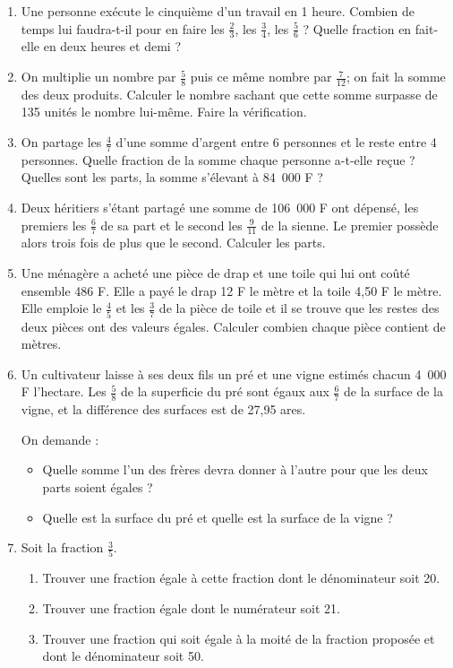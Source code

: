 \documentclass[12 pt]{extarticle}
\theoremstyle{plain}
\begin{document}
\begin{enumerate}
\item Une personne exécute le cinquième d'un travail en 1 heure. Combien de temps lui faudra-t-il pour en 
faire les $\frac23$, les $\frac34$, les $\frac56$ ?
Quelle fraction en fait-elle en deux heures et demi ? 
\item On multiplie un nombre par $\frac58$ puis ce même nombre par $\frac7{12}$; on fait la somme des deux produits. Calculer le nombre sachant que cette somme surpasse de 135 unités le nombre lui-même. Faire la vérification. 
\item On partage les $\frac47$ d'une somme d'argent entre 6 personnes et le reste entre 4 personnes. 
Quelle fraction de la somme chaque personne a-t-elle 
reçue ? Quelles sont les parts, la somme s'élevant à 84~000 F ? 
\item Deux héritiers s'étant partagé une somme de 106~000 F ont dépensé, les premiers les $\frac67$ de sa part et le second les $\frac9{11}$ de la sienne. Le premier possède alors trois fois de plus que le second. Calculer les parts. 
\item Une ménagère a acheté une pièce de drap et une toile qui lui ont coûté ensemble 486 F. Elle a payé le drap 12 F le mètre et la toile 4,50 F le mètre. Elle emploie le $\frac45$ et les $\frac37$ de la pièce de toile et il se trouve que les restes des deux pièces ont des valeurs égales. Calculer combien chaque pièce contient de mètres. 
\item Un cultivateur laisse à ses deux fils un pré et une vigne estimés chacun 4~000 F l'hectare. Les $\frac58$ de la superficie du pré sont égaux aux $\frac67$ de la surface de la vigne, et la différence des surfaces est de 27,95 ares. 

On demande : \begin{itemize}
\item Quelle somme l'un des frères devra donner à l'autre pour que les deux parts soient égales ? 
\item Quelle est la surface du pré et quelle est la surface de la vigne ? 
\end{itemize}
\item Soit la fraction $\frac35$. 
\begin{enumerate}
\item Trouver une fraction égale à cette fraction dont le dénominateur soit 20. 
\item Trouver une fraction égale dont le numérateur soit 21. 
\item Trouver une fraction qui soit égale à la moité de la fraction proposée et dont le dénominateur soit 50. 
\end{enumerate} 
 \end{enumerate}
 
\end{document}
